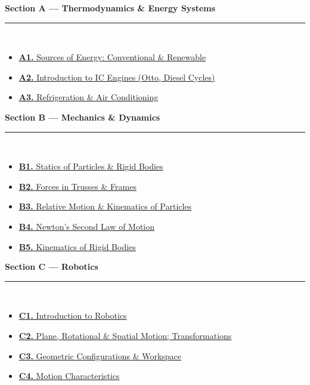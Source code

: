 \documentclass[12pt,a3paper]{article}
\begin{document}
\begin{tcolorbox}[colback=cA!5,colframe=cA,boxrule=1pt,arc=5pt,
  left=8pt,right=8pt,top=8pt,bottom=8pt,before skip=4pt]
  {\large\bfseries\textcolor{cA}{Section A --- Thermodynamics \& Energy Systems}}\\[5pt]
  \textcolor{cA!40}{\rule{\textwidth}{0.4pt}}\\[3pt]
  \small\begin{itemize}[leftmargin=1.2em,itemsep=1pt,label={\textcolor{cA}{$\triangleright$}}]
    \item \hyperref[sec:A1]{\textbf{A1.} Sources of Energy: Conventional \& Renewable}
    \item \hyperref[sec:A2]{\textbf{A2.} Introduction to IC Engines (Otto, Diesel Cycles)}
    \item \hyperref[sec:A3]{\textbf{A3.} Refrigeration \& Air Conditioning}
  \end{itemize}
\end{tcolorbox}

\begin{tcolorbox}[colback=cB!5,colframe=cB,boxrule=1pt,arc=5pt,
  left=8pt,right=8pt,top=8pt,bottom=8pt,before skip=4pt]
  {\large\bfseries\textcolor{cB}{Section B --- Mechanics \& Dynamics}}\\[5pt]
  \textcolor{cB!40}{\rule{\textwidth}{0.4pt}}\\[3pt]
  \small\begin{itemize}[leftmargin=1.2em,itemsep=1pt,label={\textcolor{cB}{$\triangleright$}}]
    \item \hyperref[sec:B1]{\textbf{B1.} Statics of Particles \& Rigid Bodies}
    \item \hyperref[sec:B2]{\textbf{B2.} Forces in Trusses \& Frames}
    \item \hyperref[sec:B3]{\textbf{B3.} Relative Motion \& Kinematics of Particles}
    \item \hyperref[sec:B4]{\textbf{B4.} Newton's Second Law of Motion}
    \item \hyperref[sec:B5]{\textbf{B5.} Kinematics of Rigid Bodies}
  \end{itemize}
\end{tcolorbox}

\begin{tcolorbox}[colback=cC!5,colframe=cC,boxrule=1pt,arc=5pt,
  left=8pt,right=8pt,top=8pt,bottom=8pt,before skip=4pt]
  {\large\bfseries\textcolor{cC}{Section C --- Robotics}}\\[5pt]
  \textcolor{cC!40}{\rule{\textwidth}{0.4pt}}\\[3pt]
  \small\begin{itemize}[leftmargin=1.2em,itemsep=1pt,label={\textcolor{cC}{$\triangleright$}}]
    \item \hyperref[sec:C1]{\textbf{C1.} Introduction to Robotics}
    \item \hyperref[sec:C2]{\textbf{C2.} Plane, Rotational \& Spatial Motion; Transformations}
    \item \hyperref[sec:C3]{\textbf{C3.} Geometric Configurations \& Workspace}
    \item \hyperref[sec:C4]{\textbf{C4.} Motion Characteristics}
  \end{itemize}
\end{tcolorbox}
\end{document}
